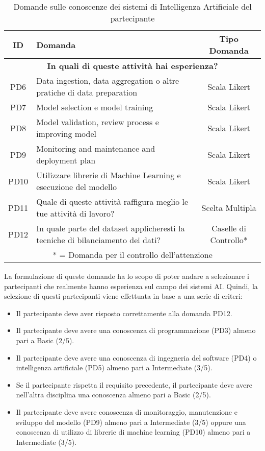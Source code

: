 \newlength{\thickarrayrulewidth}
\setlength{\thickarrayrulewidth}{2\arrayrulewidth}
\begin{table}[h!]
    \centering
    \begin{tabular}{|c|p{7cm}|c|}
        \hline
        \textbf{ID} & \textbf{Domanda} & \textbf{Tipo Domanda}\\
        \hline
        \hline
        \multicolumn{3}{|c|}{\textbf{In quali di queste attività hai esperienza?}}\\
        \hline
        PD6 & Data ingestion, data aggregation o altre pratiche di data preparation  & Scala Likert\\
        \hline
            PD7 & Model selection e model training  & Scala Likert\\
        \hline
        PD8 & Model validation, review process e improving model  & Scala Likert\\
        \hline
        PD9 & Monitoring and maintenance and deployment plan  & Scala Likert\\
        \hline
        PD10 & Utilizzare librerie di Machine Learning e esecuzione del modello  & Scala Likert\\
        \hline
        \hline
        PD11 & Quale di queste attività raffigura meglio le tue attività di lavoro? & Scelta Multipla\\
        \hline
        PD12 & In quale parte del dataset applicheresti la tecniche di bilanciamento dei dati? & Caselle di Controllo*\\
        \hline
        \multicolumn{3}{c}{* = Domanda per il controllo dell'attenzione}
    \end{tabular}
    \caption{Domande sulle conoscenze dei sistemi di Intelligenza Artificiale del partecipante}
    \label{tab:info_ai}
\end{table}

La formulazione di queste domande ha lo scopo di poter andare a selezionare i partecipanti che realmente hanno esperienza sul campo dei sistemi AI.
Quindi, la selezione di questi partecipanti viene effettuata in base a una serie di criteri:
\begin{itemize}
    \item Il partecipante deve aver risposto correttamente alla domanda PD12.
    \item Il partecipante deve avere una conoscenza di programmazione (PD3) almeno pari a Basic (2/5).
    \item Il partecipante deve avere una conoscenza di ingegneria del software (PD4) o intelligenza artificiale (PD5) almeno pari a Intermediate (3/5).
    \item Se il partecipante rispetta il requisito precedente, il partecipante deve avere nell'altra disciplina una conoscenza almeno pari a Basic (2/5).
    \item Il partecipante deve avere conoscenza di monitoraggio, manutenzione e sviluppo del modello (PD9) almeno pari a Intermediate (3/5) oppure una conoscenza di utilizzo di librerie di machine learning (PD10) almeno pari a Intermediate (3/5).
\end{itemize}


